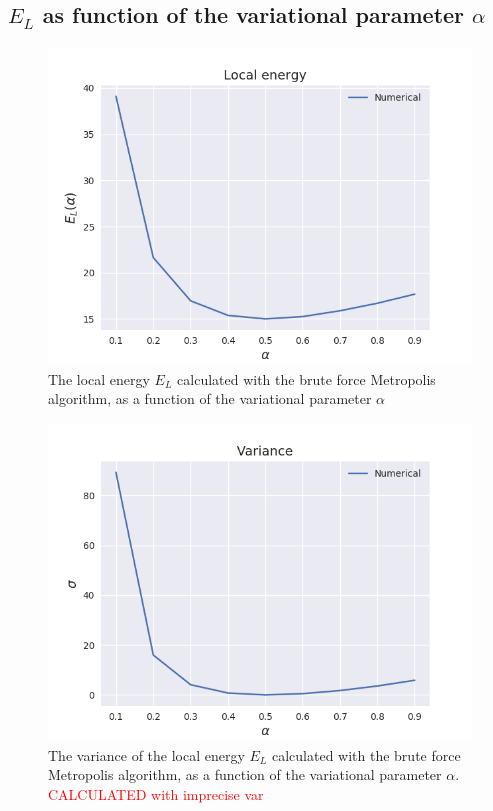 \documentclass[norsk,a4paper,12pt]{article}
\begin{document}
 \subsection{$E_L$ as function of the variational parameter $\alpha$}

\begin{figure} [H]
	\centering
	\includegraphics[scale=0.65]{images/energy.png}
	\caption{The local energy $E_L$ calculated with the brute force Metropolis algorithm, as a function of the variational parameter $\alpha$}
	\label{fig:EL_as_func_of_alpha}
\end{figure} 

\begin{figure} [H]
	\centering
	\includegraphics[scale=0.65]{images/variance.png}
	\caption{The variance of the local energy $E_L$ calculated with the brute force Metropolis algorithm, as a function of the variational parameter $\alpha$. \textcolor{red}{CALCULATED with imprecise var}}
	\label{fig:variance_EL_as_func_of_alpha}
\end{figure} 
\end{document}
